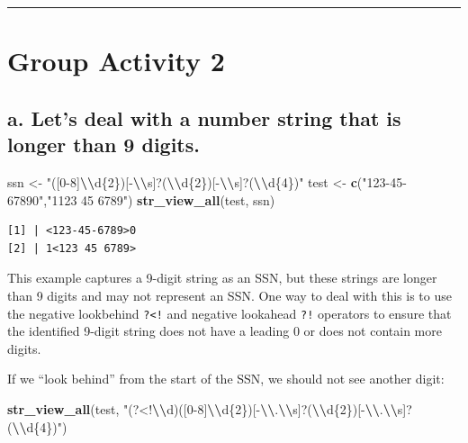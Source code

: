 \documentclass[
]{book}
\newenvironment{Shaded}{\begin{snugshade}}{\end{snugshade}}
\newcommand{\FunctionTok}[1]{\textcolor[rgb]{0.13,0.29,0.53}{\textbf{#1}}}
\newcommand{\NormalTok}[1]{#1}
\newcommand{\OtherTok}[1]{\textcolor[rgb]{0.56,0.35,0.01}{#1}}
\newcommand{\SpecialCharTok}[1]{\textcolor[rgb]{0.81,0.36,0.00}{\textbf{#1}}}
\newcommand{\StringTok}[1]{\textcolor[rgb]{0.31,0.60,0.02}{#1}}
\begin{document}
\begin{center}\rule{0.5\linewidth}{0.5pt}\end{center}

\hypertarget{group-activity-2}{%
\section{Group Activity 2}\label{group-activity-2}}

\hypertarget{a.-lets-deal-with-a-number-string-that-is-longer-than-9-digits.}{%
\subsection{a. Let's deal with a number string that is longer than 9 digits.}\label{a.-lets-deal-with-a-number-string-that-is-longer-than-9-digits.}}

\begin{Shaded}
\begin{Highlighting}[]
\NormalTok{ssn }\OtherTok{\textless{}{-}} \StringTok{"([0{-}8]}\SpecialCharTok{\textbackslash{}\textbackslash{}}\StringTok{d\{2\})[{-}}\SpecialCharTok{\textbackslash{}\textbackslash{}}\StringTok{s]?(}\SpecialCharTok{\textbackslash{}\textbackslash{}}\StringTok{d\{2\})[{-}}\SpecialCharTok{\textbackslash{}\textbackslash{}}\StringTok{s]?(}\SpecialCharTok{\textbackslash{}\textbackslash{}}\StringTok{d\{4\})"}
\NormalTok{test }\OtherTok{\textless{}{-}} \FunctionTok{c}\NormalTok{(}\StringTok{"123{-}45{-}67890"}\NormalTok{,}\StringTok{"1123 45 6789"}\NormalTok{)}
\FunctionTok{str\_view\_all}\NormalTok{(test, ssn)}
\end{Highlighting}
\end{Shaded}

\begin{verbatim}
[1] | <123-45-6789>0
[2] | 1<123 45 6789>
\end{verbatim}

This example captures a 9-digit string as an SSN, but these strings are longer than 9 digits and may not represent an SSN. One way to deal with this is to use the negative lookbehind \texttt{?\textless{}!} and negative lookahead \texttt{?!} operators to ensure that the identified 9-digit string does not have a leading 0 or does not contain more digits.

If we ``look behind'' from the start of the SSN, we should not see another digit:

\begin{Shaded}
\begin{Highlighting}[]
\FunctionTok{str\_view\_all}\NormalTok{(test, }\StringTok{"(?\textless{}!}\SpecialCharTok{\textbackslash{}\textbackslash{}}\StringTok{d)([0{-}8]}\SpecialCharTok{\textbackslash{}\textbackslash{}}\StringTok{d\{2\})[{-}}\SpecialCharTok{\textbackslash{}\textbackslash{}}\StringTok{.}\SpecialCharTok{\textbackslash{}\textbackslash{}}\StringTok{s]?(}\SpecialCharTok{\textbackslash{}\textbackslash{}}\StringTok{d\{2\})[{-}}\SpecialCharTok{\textbackslash{}\textbackslash{}}\StringTok{.}\SpecialCharTok{\textbackslash{}\textbackslash{}}\StringTok{s]?(}\SpecialCharTok{\textbackslash{}\textbackslash{}}\StringTok{d\{4\})"}\NormalTok{)}
\end{Highlighting}
\end{Shaded}
\end{document}
